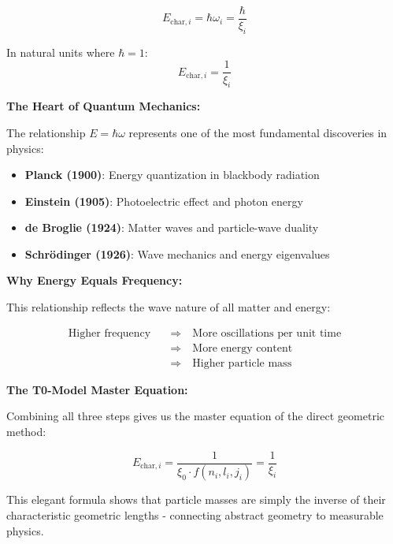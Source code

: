 \documentclass[12pt,a4paper]{article}
\begin{document}
	\begin{equation}
		E_{\text{char},i} = \hbar \omega_i = \frac{\hbar}{\xi_i}
		\label{eq:energy_from_frequency}
	\end{equation}
	
	In natural units where $\hbar = 1$:
	\begin{equation}
		\boxed{E_{\text{char},i} = \frac{1}{\xi_i}}
		\label{eq:characteristic_energy_direct}
	\end{equation}
	
	\textbf{The Heart of Quantum Mechanics:}
	
	The relationship $E = \hbar \omega$ represents one of the most fundamental discoveries in physics:
	
	\begin{itemize}
		\item \textbf{Planck (1900)}: Energy quantization in blackbody radiation
		\item \textbf{Einstein (1905)}: Photoelectric effect and photon energy
		\item \textbf{de Broglie (1924)}: Matter waves and particle-wave duality
		\item \textbf{Schrödinger (1926)}: Wave mechanics and energy eigenvalues
	\end{itemize}
	
	\textbf{Why Energy Equals Frequency:}
	
	This relationship reflects the wave nature of all matter and energy:
	
	\begin{align}
		\text{Higher frequency} \quad &\Rightarrow \quad \text{More oscillations per unit time} \\
		&\Rightarrow \quad \text{More energy content} \\
		&\Rightarrow \quad \text{Higher particle mass}
	\end{align}
	
	\textbf{The T0-Model Master Equation:}
	
	Combining all three steps gives us the master equation of the direct geometric method:
	
	\begin{equation}
		\boxed{E_{\text{char},i} = \frac{1}{\xi_0 \cdot f(n_i, l_i, j_i)} = \frac{1}{\xi_i}}
		\label{eq:master_equation_direct}
	\end{equation}
	
	This elegant formula shows that particle masses are simply the inverse of their characteristic geometric lengths - connecting abstract geometry to measurable physics.
	
\end{document}
